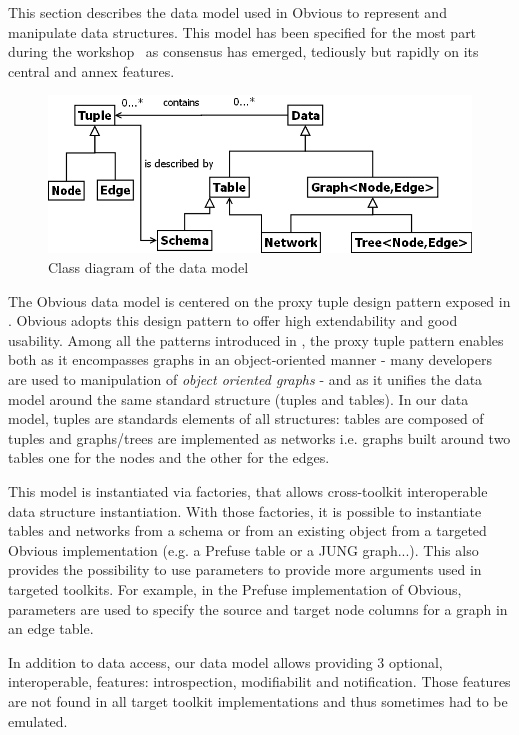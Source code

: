 This section describes the data model used in Obvious to represent and manipulate data structures.
This model has been  specified for the most part during the workshop~\cite{vismaster2008} as consensus has emerged, tediously but rapidly on its central and annex features.

\begin{figure}[!ht]
\includegraphics[width=\columnwidth]{figures/obviousdataclass}
\caption{Class diagram of the data model}
\label{fig:datamodel}
\end{figure}

The Obvious data model is centered on the proxy tuple design pattern exposed in \cite{DesignPatternsIV}. Obvious adopts this design pattern to offer high extendability and good usability. Among all the patterns introduced in \cite{DesignPatternsIV}, the proxy tuple pattern enables both as it encompasses graphs in an object-oriented manner - many developers are used to manipulation of \emph{object oriented graphs} - and as it unifies the data model around the same standard structure (tuples and tables). In our data model, tuples are standards elements of all structures: tables are composed of tuples and graphs/trees are implemented as networks i.e. graphs built around two tables one for the nodes and the other for the edges. 

This model is instantiated via factories, that allows cross-toolkit interoperable data structure instantiation. With those factories, it is possible to instantiate tables and networks from a schema or from an existing object from a targeted Obvious implementation (e.g. a Prefuse table or a JUNG graph...). This also provides the possibility to use parameters to provide more arguments used in targeted toolkits. For example, in the Prefuse implementation of Obvious, parameters are used to specify the source and target node columns for a graph in an edge table.

In addition to data access, our data model allows providing 3 optional, interoperable, features: introspection, modifiabilit and notification. Those features are not found in all target toolkit implementations and thus sometimes had to be emulated.
 
